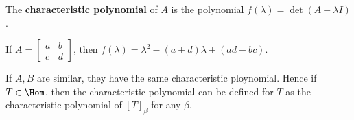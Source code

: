 \documentclass[11pt]{scrartcl}
\begin{document}
\begin{definition}
  The \textbf{characteristic polynomial} of \(A\) is the polynomial
  \(f(\lambda) = \det(A-\lambda I)\).
\end{definition}
\begin{example}
  If \(A = \begin{bmatrix}
    a & b\\
    c & d
  \end{bmatrix}\), then \(f(\lambda) = \lambda^{2} -(a+d)\lambda + (ad - bc)\).
\end{example}

\begin{remark}
  If \(A, B\) are similar, they have the same characteristic
  ploynomial. Hence if \(T\in \Hom\), then the characteristic
  polynomial can be defined for \(T\) as the characteristic polynomial
  of \([T]_{\beta}\) for any \(\beta\).
\end{remark}
\end{document}
